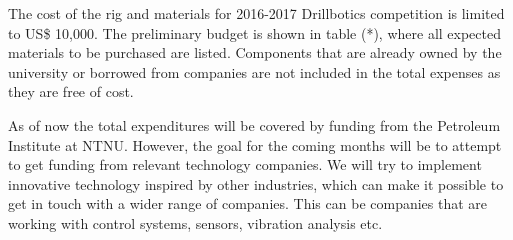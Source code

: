 The cost of the rig and materials for 2016-2017 Drillbotics competition is limited to US\$ 10,000. The preliminary budget is shown in table (*), where all expected materials to be purchased are listed. Components that are already owned by the university or borrowed from companies are not included in the total expenses as they are free of cost.  

As of now the total expenditures will be covered by funding from the Petroleum Institute at NTNU. However, the goal for the coming months will be to attempt to get funding from relevant technology companies. We will try to implement innovative technology inspired by other industries, which can make it possible to get in touch with a wider range of companies. This can be companies that are working with control systems, sensors, vibration analysis etc. 

